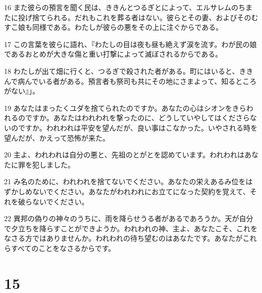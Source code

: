\par 16 また彼らの預言を聞く民は、ききんとつるぎとによって、エルサレムのちまたに投げ捨てられる。だれもこれを葬る者はない。彼らとその妻、およびそのむすこ娘も同様である。わたしが彼らの悪をその上に注ぐからである。
\par 17 この言葉を彼らに語れ、『わたしの目は夜も昼も絶えず涙を流す。わが民の娘であるおとめが大きな傷と重い打撃によって滅ぼされるからである。
\par 18 わたしが出て畑に行くと、つるぎで殺された者がある。町にはいると、ききんで病んでいる者がある。預言者も祭司も共にその地にさまよって、知るところがない』」。
\par 19 あなたはまったくユダを捨てられたのですか。あなたの心はシオンをきらわれるのですか。あなたはわれわれを撃ったのに、どうしていやしてはくださらないのですか。われわれは平安を望んだが、良い事はこなかった。いやされる時を望んだが、かえって恐怖が来た。
\par 20 主よ、われわれは自分の悪と、先祖のとがとを認めています。われわれはあなたに罪を犯しました。
\par 21 み名のために、われわれを捨てないでください。あなたの栄えあるみ位をはずかしめないでください。あなたがわれわれにお立てになった契約を覚えて、それを破らないでください。
\par 22 異邦の偽りの神々のうちに、雨を降らせうる者があるであろうか。天が自分で夕立ちを降らすことができようか。われわれの神、主よ、あなたこそ、これをなさる方ではありませんか。われわれの待ち望むのはあなたです。あなたがこれらすべてのことをなさるからです。

\chapter{15}


